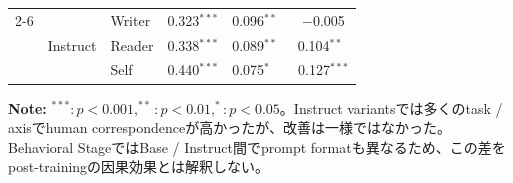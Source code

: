 \begin{table}[htbp]
\begin{tabular}{lll ccc}
\cmidrule(lr){2-6}
                                 & \multirow{3}{*}{Instruct} & Writer     & 0.323$^{***}$            & 0.096$^{**}\phantom{^{*}}$ & $-$0.005\phantom{$^{***}$} \\
                                 &                          & Reader     & 0.338$^{***}$            & 0.089$^{**}\phantom{^{*}}$ & 0.104$^{**}\phantom{^{*}}$ \\
                                 &                          & Self       & 0.440$^{***}$            & 0.075$^{*}\phantom{^{**}}$ & 0.127$^{***}$            \\
\bottomrule
\end{tabular}
\vspace{1ex}
\begin{minipage}{\linewidth}
\footnotesize
\textbf{Note:} $^{***}: p < 0.001, ^{**}: p < 0.01, ^{*}: p < 0.05$。Instruct variantsでは多くのtask / axisでhuman correspondenceが高かったが、改善は一様ではなかった。Behavioral StageではBase / Instruct間でprompt formatも異なるため、この差をpost-trainingの因果効果とは解釈しない。
\end{minipage}
\end{table}

